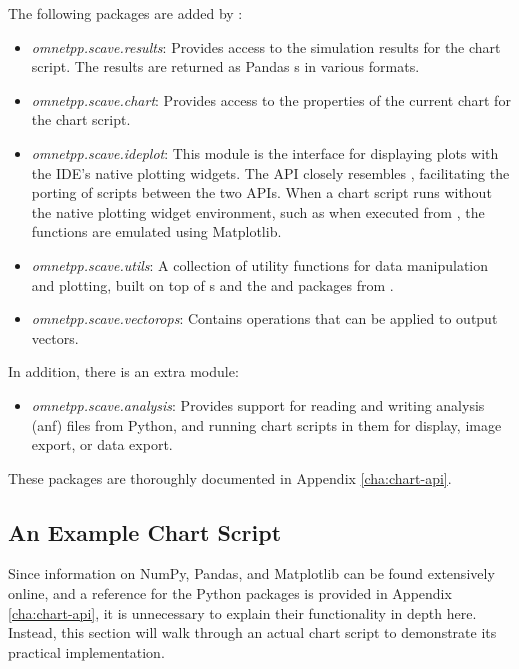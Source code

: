 The following packages are added by {\opp}:

\begin{itemize}
  \item \textit{omnetpp.scave.results}: Provides access to the simulation
    results for the chart script. The results are returned as Pandas
    s in various formats.
  \item \textit{omnetpp.scave.chart}: Provides access to the properties of the
    current chart for the chart script.
  \item \textit{omnetpp.scave.ideplot}: This module is the interface for
    displaying plots with the IDE's native plotting widgets. The API closely
    resembles , facilitating the porting of scripts between
    the two APIs. When a chart script runs without the native plotting widget
    environment, such as when executed from , the functions
    are emulated using Matplotlib.
  \item \textit{omnetpp.scave.utils}: A collection of utility functions for data
    manipulation and plotting, built on top of s and the
     and  packages from .
  \item \textit{omnetpp.scave.vectorops}: Contains operations that can be
    applied to output vectors.
\end{itemize}

In addition, there is an extra module:

\begin{itemize}
  \item \textit{omnetpp.scave.analysis}: Provides support for reading and
    writing analysis (anf) files from Python, and running chart scripts in them
    for display, image export, or data export.
\end{itemize}

These packages are thoroughly documented in Appendix \ref{cha:chart-api}.

\subsection{An Example Chart Script}
\label{sec:ana-sim:example_chart_script}

Since information on NumPy, Pandas, and Matplotlib can be found extensively
online, and a reference for the  Python packages is
provided in Appendix \ref{cha:chart-api}, it is unnecessary to explain their functionality in
depth here. Instead, this section will walk through an actual chart script to
demonstrate its practical implementation.

